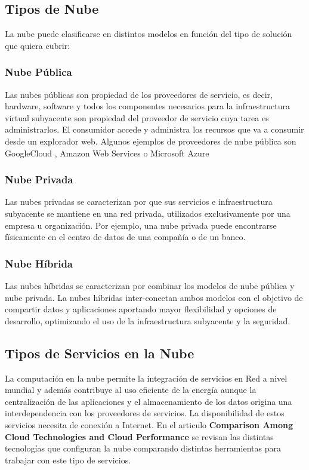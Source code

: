 \documentclass[a4paper,11pt]{book}
\begin{document}
\subsection{Tipos de Nube}

La nube puede clasificarse en distintos modelos en función del tipo de solución que quiera cubrir:

\subsubsection{Nube Pública}

Las nubes públicas son propiedad de los proveedores de servicio, es decir, hardware, software y todos los componentes necesarios para la infraestructura virtual subyacente son propiedad del proveedor de servicio cuya tarea es administrarlos. El consumidor accede y administra los recursos que va a consumir desde un explorador web.  Algunos ejemplos de proveedores de nube pública son GoogleCloud\cite{gcp} , Amazon Web Services\cite{aws} o Microsoft Azure\cite{azure}

\subsubsection{Nube Privada}
Las nubes privadas se caracterizan por que sus servicios e infraestructura subyacente se mantiene en una red privada, utilizados exclusivamente por una empresa u organización. Por ejemplo, una nube privada puede encontrarse físicamente en el centro de datos de una compañía o de un banco.

\subsubsection{Nube Híbrida}

Las nubes híbridas se caracterizan por combinar los modelos de nube pública y nube privada. La nubes híbridas inter-conectan ambos modelos con el objetivo de compartir datos y aplicaciones aportando mayor flexibilidad y opciones de desarrollo, optimizando el uso de la infraestructura subyacente y la seguridad.


\subsection{Tipos de Servicios en la Nube}

La computación en la nube permite la integración de servicios en Red a nivel mundial y además contribuye al uso eficiente de la energía aunque la centralización de las aplicaciones y el almacenamiento de los datos origina una interdependencia con los proveedores de servicios. La disponibilidad de estos servicios necesita de conexión a Internet.  En el articulo \textbf{Comparison Among Cloud Technologies and Cloud Performance}\cite{cloudtech} se revisan las distintas tecnologías que configuran la nube comparando distintas herramientas para trabajar con este tipo de servicios.
\end{document}
